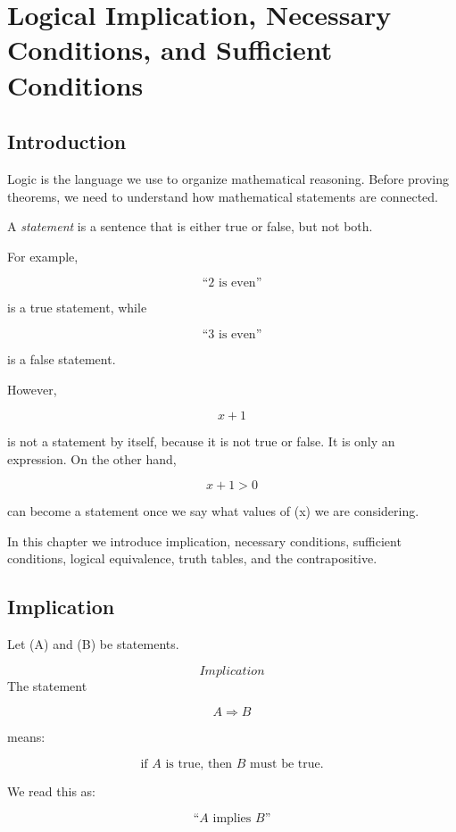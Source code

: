 \section{Logical Implication, Necessary Conditions, and Sufficient Conditions}

\subsection{Introduction}

Logic is the language we use to organize mathematical reasoning. Before proving
theorems, we need to understand how mathematical statements are connected.

A \emph{statement} is a sentence that is either true or false, but not both.

For example,

\[
\text{``$2$ is even''}
\]

is a true statement, while

\[
\text{``$3$ is even''}
\]

is a false statement.

However,

\[
x+1
\]

is not a statement by itself, because it is not true or false. It is only an
expression. On the other hand,

\[
x+1>0
\]

can become a statement once we say what values of (x) we are considering.

In this chapter we introduce implication, necessary conditions, sufficient
conditions, logical equivalence, truth tables, and the contrapositive.

\subsection{Implication}

Let (A) and (B) be statements.

\begin{definition}\[Implication\]
The statement

\[
A \Rightarrow B
\]

means:

\[
\text{if $A$ is true, then $B$ must be true.}
\]

\end{definition}

We read this as:

\[
\text{``$A$ implies $B$''}
\]

